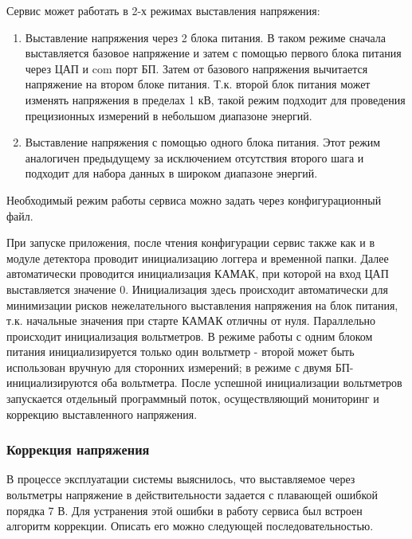 \documentclass[a4paper,14pt]{extreport}
\begin{document}
Сервис может работать в 2-х режимах выставления напряжения:

\begin{enumerate}
    \item Выставление напряжения через 2 блока питания. В таком режиме сначала выставляется базовое напряжение и затем с помощью первого блока питания через ЦАП и com порт БП. Затем от базового напряжения вычитается напряжение на втором блоке питания. Т.к. второй блок питания может изменять напряжения в пределах 1 кВ, такой режим подходит для проведения прецизионных измерений в небольшом диапазоне энергий.
    \item Выставление напряжения с помощью одного блока питания. Этот режим аналогичен предыдущему за исключением отсутствия второго шага и подходит для набора данных в широком диапазоне энергий.
\end{enumerate}
Необходимый режим работы сервиса можно задать через конфигурационный файл.

При запуске приложения, после чтения конфигурации сервис также как и в модуле детектора проводит инициализацию логгера и временной папки. Далее автоматически проводится инициализация КАМАК, при которой на вход ЦАП выставляется значение 0. Инициализация здесь происходит автоматически для минимизации рисков нежелательного выставления напряжения на блок питания, т.к. начальные значения при старте КАМАК отличны от нуля. Параллельно происходит инициализация вольтметров. В режиме работы с одним блоком питания инициализируется только один вольтметр - второй может быть использован вручную для сторонних измерений; в режиме с двумя БП- инициализируются оба вольтметра. После успешной инициализации вольтметров запускается отдельный программный поток, осуществляющий мониторинг и коррекцию выставленного напряжения.

\subsubsection{Коррекция напряжения}

В процессе эксплуатации системы выяснилось, что выставляемое через вольтметры напряжение в действительности задается с плавающей ошибкой порядка 7 В. Для устранения этой ошибки в работу сервиса был встроен алгоритм коррекции. Описать его можно следующей последовательностью.
\end{document}
